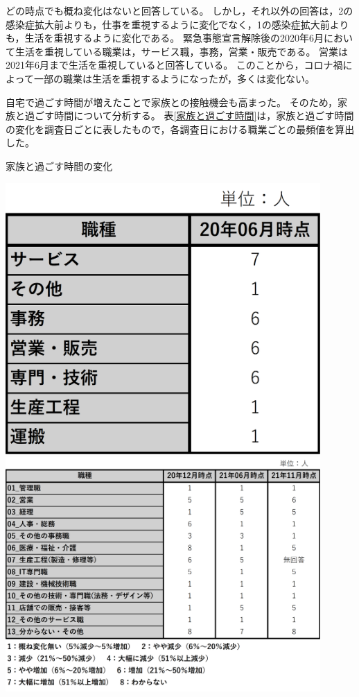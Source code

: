 \documentclass[paper={210mm,297mm},fontsize=15Q,line_length=35zw,number_of_lines=31,head_space=30mm,gutter=40mm,baselineskip=2.0zw,headfoot_verticalposition=1.5zw]{jlreq}
\begin{document}
どの時点でも概ね変化はないと回答している。
しかし，それ以外の回答は，2の感染症拡大前よりも，仕事を重視するように変化でなく，1の感染症拡大前よりも，生活を重視するように変化である。
緊急事態宣言解除後の2020年6月において生活を重視している職業は，サービス職，事務，営業・販売である。
営業は2021年6月まで生活を重視していると回答している。
このことから，コロナ禍によって一部の職業は生活を重視するようになったが，多くは変化ない。

自宅で過ごす時間が増えたことで家族との接触機会も高まった。
そのため，家族と過ごす時間について分析する。
表\ref{家族と過ごす時間}は，家族と過ごす時間の変化を調査日ごとに表したもので，各調査日における職業ごとの最頻値を算出した。

\begin{table}[H]
  \centering
  \caption{家族と過ごす時間の変化}
  \includegraphics[width=120mm]{../Figure/c05s02_table_調査日ごとの家族と過ごす時間の変化-01.png}
  \includegraphics[width=120mm]{../Figure/c05s02_table_調査日ごとの家族と過ごす時間の変化-02.png}
  \label{家族と過ごす時間}
\end{table}
\end{document}
